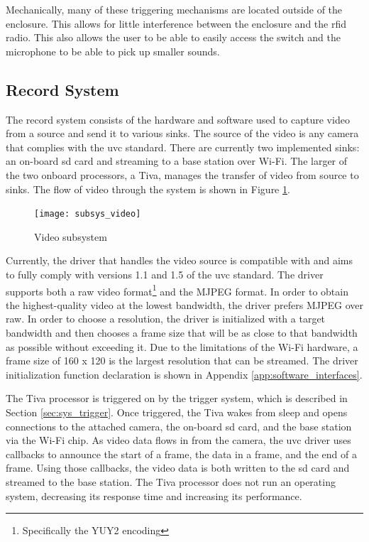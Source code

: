 \documentclass[12pt]{article}
\begin{document}
Mechanically, many of these triggering mechanisms are located outside of the
enclosure. This allows for little interference between the enclosure and the
\gls{rfid} radio. This also allows the user to be able to easily access the
switch and the microphone to be able to pick up smaller sounds.

\subsection{Record System}
\label{sec:sys_video}
The record system consists of the hardware and software used to capture video
from a source and send it to various sinks. The source of the video is any
camera that complies with the \gls{uvc} standard. There are currently two
implemented sinks: an on-board \gls{sd} card and streaming to a base station
over Wi-Fi. The larger of the two onboard processors, a Tiva, manages the
transfer of video from source to sinks. The flow of video through the system is
shown in Figure \ref{fig:video_flow}.

\begin{figure}[h]
    \centering
    \texttt{[image: subsys\_video]}
    \caption{Video subsystem}
    \label{fig:video_flow}
\end{figure}

Currently, the driver that handles the video source is compatible with and aims
to fully comply with versions 1.1 and 1.5 of the \gls{uvc}
standard\cite{uvc_standard_11,uvc_standard_15}. The driver supports both a raw
video format\footnote{Specifically the YUY2 encoding} and the MJPEG format. In
order to obtain the highest-quality video at the lowest bandwidth, the driver
prefers MJPEG over raw. In order to choose a resolution, the driver is
initialized with a target bandwidth and then chooses a frame size that will be
as close to that bandwidth as possible without exceeding it. Due to the
limitations of the Wi-Fi hardware, a frame size of 160 x 120 is the largest
resolution that can be streamed. The driver initialization function declaration
is shown in Appendix \ref{app:software_interfaces}.

The Tiva processor is triggered on by the trigger system, which is described in
Section \ref{sec:sys_trigger}. Once triggered, the Tiva wakes from sleep and
opens connections to the attached camera, the on-board \gls{sd} card, and the
base station via the Wi-Fi chip. As video data flows in from the camera, the
\gls{uvc} driver uses callbacks to announce the start of a frame, the data in a
frame, and the end of a frame. Using those callbacks, the video data is both
written to the \gls{sd} card and streamed to the base station. The Tiva
processor does not run an operating system, decreasing its response time and
increasing its performance.
\end{document}
